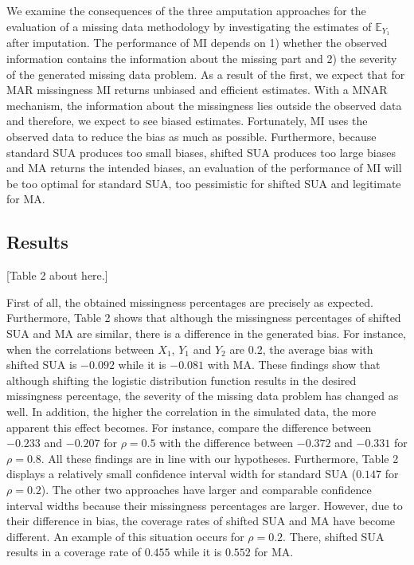 \documentclass[]{interact}
\begin{document}
We examine the consequences of the three amputation approaches for the evaluation of a missing data methodology by investigating the estimates of $\mathbb{E}_{Y_1}$ after imputation. The performance of MI depends on 1) whether the observed information contains the information about the missing part and 2) the severity of the generated missing data problem. As a result of the first, we expect that for MAR missingness MI returns unbiased and efficient estimates. With a MNAR mechanism, the information about the missingness lies outside the observed data and therefore, we expect to see biased estimates. Fortunately, MI uses the observed data to reduce the bias as much as possible. Furthermore, because standard SUA produces too small biases, shifted SUA produces too large biases and MA returns the intended biases, an evaluation of the performance of MI will be too optimal for standard SUA, too pessimistic for shifted SUA and legitimate for MA.  

\subsection{\normalsize Results}\label{results2}

[Table 2 about here.]


  
First of all, the obtained missingness percentages are precisely as expected. Furthermore, Table 2 shows that although the missingness percentages of shifted SUA and MA are similar, there is a difference in the generated bias. For instance, when the correlations between $X_1$, $Y_1$ and $Y_2$ are $0.2$, the average bias with shifted SUA is $-0.092$ while it is $-0.081$ with MA. These findings show that although shifting the logistic distribution function results in the desired missingness percentage, the severity of the missing data problem has changed as well. In addition, the higher the correlation in the simulated data, the more apparent this effect becomes. For instance, compare the difference between $-0.233$ and $-0.207$ for $\rho = 0.5$ with the difference between $-0.372$ and $-0.331$ for $\rho = 0.8$. All these findings are in line with our hypotheses. Furthermore, Table 2 displays a relatively small confidence interval width for standard SUA ($0.147$ for $\rho = 0.2$). The other two approaches have larger and comparable confidence interval widths because their missingness percentages are larger. However, due to their difference in bias, the coverage rates of shifted SUA and MA have become different. An example of this situation occurs for $\rho = 0.2$. There, shifted SUA results in a coverage rate of $0.455$ while it is $0.552$ for MA.
\end{document}
